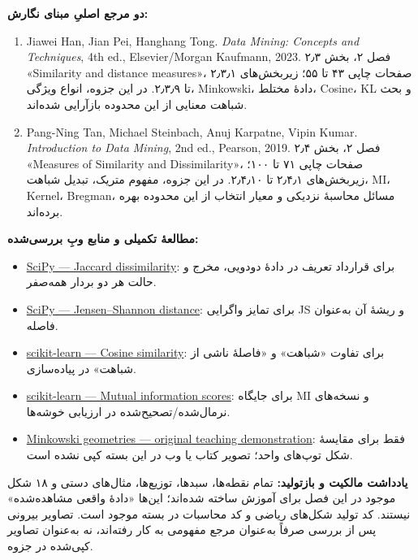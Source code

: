 \documentclass[12pt,a4paper,oneside]{book}
\providecommand{\tightlist}{\setlength{\itemsep}{0pt}\setlength{\parskip}{0pt}}
\begin{document}
\textbf{دو مرجع اصلیِ مبنای نگارش:}

\begin{enumerate}
\def\labelenumi{\arabic{enumi}.}
\tightlist
\item
  Jiawei Han, Jian Pei, Hanghang Tong. \emph{Data Mining: Concepts and Techniques}, 4th ed., Elsevier/Morgan Kaufmann, 2023. فصل ۲، بخش ۲٫۳ «Similarity and distance measures»، صفحات چاپی ۴۳ تا ۵۵؛ زیر‌بخش‌های ۲٫۳٫۱ تا ۲٫۳٫۹. در این جزوه، انواع ویژگی، Minkowski، دادهٔ مختلط، Cosine، KL و بحث شباهت معنایی از این محدوده بازآرایی شده‌اند.
\item
  Pang-Ning Tan, Michael Steinbach, Anuj Karpatne, Vipin Kumar. \emph{Introduction to Data Mining}, 2nd ed., Pearson, 2019. فصل ۲، بخش ۲٫۴ «Measures of Similarity and Dissimilarity»، صفحات چاپی ۷۱ تا ۱۰۰؛ زیربخش‌های ۲٫۴٫۱ تا ۲٫۴٫۱۰. در این جزوه، مفهوم متریک، تبدیل شباهت، MI، Kernel، Bregman، مسائل محاسبهٔ نزدیکی و معیار انتخاب از این محدوده بهره برده‌اند.
\end{enumerate}

\textbf{مطالعهٔ تکمیلی و منابع وبِ بررسی‌شده:}

\begin{itemize}
\tightlist
\item
  \href{https://docs.scipy.org/doc/scipy/reference/generated/scipy.spatial.distance.jaccard.html}{SciPy --- Jaccard dissimilarity}: برای قرارداد تعریف در دادهٔ دودویی، مخرج و حالت هر دو بردار همه‌صفر.
\item
  \href{https://docs.scipy.org/doc/scipy/reference/generated/scipy.spatial.distance.jensenshannon.html}{SciPy --- Jensen--Shannon distance}: برای تمایز واگرایی JS و ریشهٔ آن به‌عنوان فاصله.
\item
  \href{https://scikit-learn.org/stable/modules/generated/sklearn.metrics.pairwise.cosine_similarity.html}{scikit-learn --- Cosine similarity}: برای تفاوت «شباهت» و «فاصلهٔ ناشی از شباهت» در پیاده‌سازی.
\item
  \href{https://scikit-learn.org/stable/modules/clustering.html\#mutual-information-based-scores}{scikit-learn --- Mutual information scores}: برای جایگاه MI و نسخه‌های نرمال‌شده/تصحیح‌شده در ارزیابی خوشه‌ها.
\item
  \href{https://en.wikipedia.org/wiki/Minkowski_distance}{Minkowski geometries --- original teaching demonstration}: فقط برای مقایسهٔ شکل توپ‌های واحد؛ تصویر کتاب یا وب در این بسته کپی نشده است.
\end{itemize}

\textbf{یادداشت مالکیت و بازتولید:} تمام نقطه‌ها، سبدها، توزیع‌ها، مثال‌های دستی و ۱۸ شکل موجود در این فصل برای آموزش ساخته شده‌اند؛ این‌ها «دادهٔ واقعی مشاهده‌شده» نیستند. کد تولید شکل‌های ریاضی و کد محاسبات در بسته موجود است. تصاویر بیرونی پس از بررسی صرفاً به‌عنوان مرجع مفهومی به کار رفته‌اند، نه به‌عنوان تصاویر کپی‌شده در جزوه.
\end{document}
